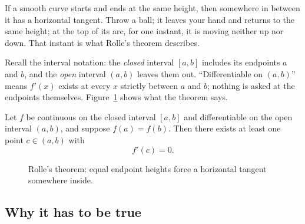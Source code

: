 \begin{intuitionbox}
If a smooth curve starts and ends at the same height, then somewhere in between it
has a horizontal tangent. Throw a ball; it leaves your hand and returns to the same
height; at the top of its arc, for one instant, it is moving neither up nor down.
That instant is what Rolle's theorem describes.
\end{intuitionbox}

Recall the interval notation: the \emph{closed}
interval $[a,b]$ includes its endpoints $a$ and $b$, and the \emph{open} interval
$(a,b)$ leaves them out. ``Differentiable on $(a,b)$'' means $f'(x)$ exists at every
$x$ strictly between $a$ and $b$; nothing is asked at the endpoints themselves.
Figure~\ref{ch15:fig-rolle} shows what the theorem says.

\begin{theorem}[Rolle, 1691]\label{ch15:thm-rolle}
Let $f$ be continuous on the closed interval $[a,b]$ and differentiable on the open
interval $(a,b)$, and suppose $f(a)=f(b)$. Then there exists at least one point
$c\in(a,b)$ with
\[
  f'(c)=0.
\]
\end{theorem}

\begin{figure}[H]
\centering
{}
\caption{Rolle's theorem: equal endpoint heights force a horizontal tangent
somewhere inside.}
\label{ch15:fig-rolle}
\end{figure}

\subsection{Why it has to be true}

